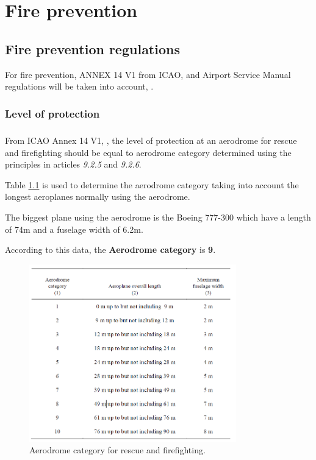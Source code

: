 \chapter{Fire prevention}
	\section{Fire prevention regulations }
	For fire prevention, ANNEX 14 V1 from ICAO, \cite{Standards2016} and Airport Service Manual regulations will be taken into account, \cite{InternationalCivilAviationOrganisation2014}.
		\subsection{Level of protection}
		\paragraph{} From ICAO Annex 14 V1, \cite{Standards2016}, the level of protection at an aerodrome for rescue and firefighting should be equal to aerodrome category determined using the principles in articles \textit{9.2.5} and \textit{9.2.6}.
		
		Table \ref{table91} is used to determine the aerodrome category taking into account the longest aeroplanes normally using the aerodrome.
		
		The biggest plane using the aerodrome is the Boeing 777-300 which have a length of 74m and a fuselage width of 6.2m.
		
		According to this data, the \textbf{Aerodrome category} is \textbf{9}.
		
		\begin{figure}[H]
			\centering
			\includegraphics[clip, trim=0cm 0cm 0cm 0cm, width=0.8\textwidth]{./images/firefighting/table91}
			\caption{Aerodrome category for rescue and firefighting.}
			\label{table91}
		\end{figure}
	

